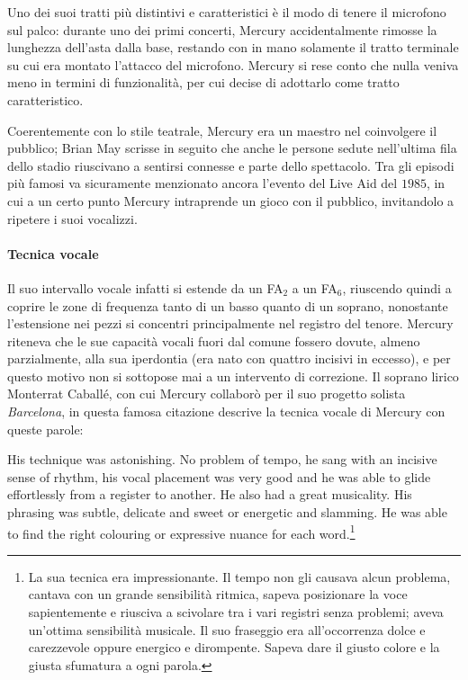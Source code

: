\documentclass[12pt]{article}
\begin{document}
Uno dei suoi tratti più distintivi e caratteristici è il modo di tenere il microfono sul palco: durante uno dei primi concerti, Mercury accidentalmente rimosse la lunghezza dell'asta dalla base, restando con in mano solamente il tratto terminale su cui era montato l'attacco del microfono. Mercury si rese conto che nulla veniva meno in termini di funzionalità, per cui decise di adottarlo come tratto caratteristico.

Coerentemente con lo stile teatrale, Mercury era un maestro nel coinvolgere il pubblico; Brian May scrisse in seguito che anche le persone sedute nell'ultima fila dello stadio riuscivano a sentirsi connesse e parte dello spettacolo. Tra gli episodi più famosi va sicuramente menzionato ancora l'evento del Live Aid del \(1985\), in cui a un certo punto Mercury intraprende un gioco con il pubblico, invitandolo a ripetere i suoi vocalizzi.

\paragraph{Tecnica vocale} Il suo intervallo vocale infatti si estende da un FA\(_{2}\) a un FA\(_{6}\), riuscendo quindi a coprire le zone di frequenza tanto di un basso quanto di un soprano, nonostante l'estensione nei pezzi si concentri principalmente nel registro del tenore. Mercury riteneva che le sue capacità vocali fuori dal comune fossero dovute, almeno parzialmente, alla sua iperdontia (era nato con quattro incisivi in eccesso), e per questo motivo non si sottopose mai a un intervento di correzione. Il soprano lirico Monterrat Caballé, con cui Mercury collaborò per il suo progetto solista \emph{Barcelona}, in questa famosa citazione descrive la tecnica vocale di Mercury con queste parole:

\begin{displayquote}
 His technique was astonishing. No problem of tempo, he sang with an incisive sense of rhythm, his vocal placement was very good and he was able to glide effortlessly from a register to another. He also had a great musicality. His phrasing was subtle, delicate and sweet or energetic and slamming. He was able to find the right colouring or expressive nuance for each word.\footnote{La sua tecnica era impressionante. Il tempo non gli causava alcun problema, cantava con un grande sensibilità ritmica, sapeva posizionare la voce sapientemente e riusciva a scivolare tra i vari registri senza problemi; aveva un'ottima sensibilità musicale. Il suo fraseggio era all'occorrenza dolce e carezzevole oppure energico e dirompente. Sapeva dare il giusto colore e la giusta sfumatura a ogni parola.}
\end{displayquote}
\end{document}
